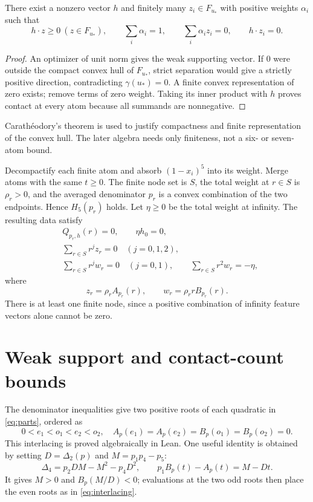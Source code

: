 \documentclass[11pt]{article}
\begin{document}
\begin{lemma}\label{lem:certificate}
There exist a nonzero vector $h$ and finitely many $z_i\in F_{u_*}$ with positive weights $\alpha_i$ such that
\begin{equation}\label{eq:certificate}
 h\cdot z\ge0\ (z\in F_{u_*}),\qquad
 \sum_i\alpha_i=1,\qquad\sum_i\alpha_i z_i=0,\qquad h\cdot z_i=0.
\end{equation}
\end{lemma}
\begin{proof}
An optimizer of unit norm gives the weak supporting vector. If $0$ were outside the compact convex hull of $F_{u_*}$, strict separation would give a strictly positive direction, contradicting $\gamma(u_*)=0$. A finite convex representation of zero exists; remove terms of zero weight. Taking its inner product with $h$ proves contact at every atom because all summands are nonnegative.
\end{proof}
Carath\'eodory's theorem is used to justify compactness and finite representation of the convex hull. The later algebra needs only finiteness, not a six- or seven-atom bound.

Decompactify each finite atom and absorb $(1-x_i)^5$ into its weight. Merge atoms with the same $t\ge0$. The finite node set is $S$, the total weight at $r\in S$ is $\rho_r>0$, and the averaged denominator $p_r$ is a convex combination of the two endpoints. Hence $H_5(p_r)$ holds. Let $\eta\ge0$ be the total weight at infinity. The resulting data satisfy
\begin{align}
 &Q_{p_r,h}(r)=0,\qquad \eta h_0=0,\label{eq:contact}\\
 &\sum_{r\in S}r^j z_r=0\quad(j=0,1,2),\label{eq:evenmom}\\
 &\sum_{r\in S}r^j w_r=0\quad(j=0,1),\qquad
 \sum_{r\in S}r^2 w_r=-\eta,\label{eq:oddmom}
\end{align}
where
\begin{equation}\label{eq:residues}
 z_r=\rho_r A_{p_r}(r),\qquad w_r=\rho_r rB_{p_r}(r).
\end{equation}
There is at least one finite node, since a positive combination of infinity feature vectors alone cannot be zero.

\section{Weak support and contact-count bounds}
The denominator inequalities give two positive roots of each quadratic in \eqref{eq:parts}, ordered as
\begin{equation}\label{eq:interlacing}
 0<e_1<o_1<e_2<o_2,
 \quad A_p(e_1)=A_p(e_2)=B_p(o_1)=B_p(o_2)=0.
\end{equation}
This interlacing is proved algebraically in Lean. One useful identity is obtained by setting $D=\Delta_2(p)$ and $M=p_1p_4-p_5$:
\[
 \Delta_4=p_2DM-M^2-p_4D^2,
 \qquad p_1B_p(t)-A_p(t)=M-Dt.
\]
It gives $M>0$ and $B_p(M/D)<0$; evaluations at the two odd roots then place the even roots as in \eqref{eq:interlacing}.
\end{document}

